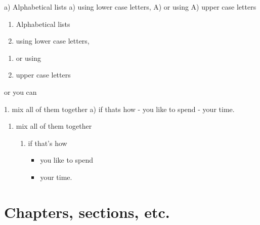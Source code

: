 \documentclass[
]{book}
\newenvironment{Shaded}{\begin{snugshade}}{\end{snugshade}}
\newcommand{\NormalTok}[1]{#1}
\newcommand{\SpecialStringTok}[1]{\textcolor[rgb]{0.31,0.60,0.02}{#1}}
\providecommand{\tightlist}{%
  \setlength{\itemsep}{0pt}\setlength{\parskip}{0pt}}
\begin{document}
\begin{Shaded}
\begin{Highlighting}[]
\NormalTok{a) Alphabetical lists}
\NormalTok{a) using lower case letters,}
\NormalTok{A) or using}
\NormalTok{A) upper case letters}
\end{Highlighting}
\end{Shaded}

\begin{enumerate}
\def\labelenumi{\alph{enumi})}
\tightlist
\item
  Alphabetical lists
\item
  using lower case letters,
\end{enumerate}

\begin{enumerate}
\def\labelenumi{\Alph{enumi})}
\tightlist
\item
  or using
\item
  upper case letters
\end{enumerate}

or you can

\begin{Shaded}
\begin{Highlighting}[]
\SpecialStringTok{1. }\NormalTok{mix all of them together}
\NormalTok{    a) if that\textquotesingle{}s how}
\SpecialStringTok{        {-} }\NormalTok{you like to spend}
\SpecialStringTok{        {-} }\NormalTok{your time. }
\end{Highlighting}
\end{Shaded}

\begin{enumerate}
\def\labelenumi{\arabic{enumi}.}
\tightlist
\item
  mix all of them together

  \begin{enumerate}
  \def\labelenumii{\alph{enumii})}
  \tightlist
  \item
    if that's how

    \begin{itemize}
    \tightlist
    \item
      you like to spend
    \item
      your time.
    \end{itemize}
  \end{enumerate}
\end{enumerate}

\chapter{Chapters, sections, etc.}\label{sec:chapters}
\end{document}
